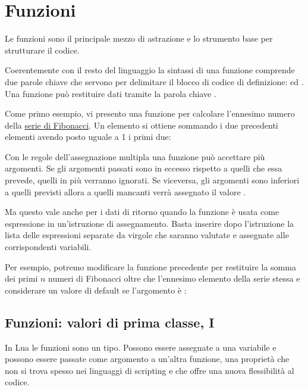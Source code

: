 
\chapter{Funzioni}

Le funzioni sono il principale mezzo di astrazione e lo strumento base per
strutturare il codice.

Coerentemente con il resto del linguaggio la sintassi di una funzione comprende
due parole chiave che servono per delimitare il blocco di codice di
definizione:  ed . Una funzione può restituire dati
tramite la parola chiave .

Come primo esempio, vi presento una funzione per calcolare l'ennesimo numero
della \href{http://it.wikipedia.org/wiki/Successione_di_Fibonacci}{serie di
Fibonacci}. Un elemento si ottiene sommando i due precedenti elementi avendo
posto uguale a 1 i primi due:

Con le regole dell'assegnazione multipla una funzione può accettare più
argomenti. Se gli argomenti passati sono in eccesso rispetto a quelli che essa
prevede, quelli in più verranno ignorati. Se viceversa, gli argomenti sono
inferiori a quelli previsti allora a quelli mancanti verrà assegnato il valore
.

Ma questo vale anche per i dati di ritorno quando la funzione è usata come
espressione in un'istruzione di assegnamento. Basta inserire dopo l'istruzione
 la lista delle espressioni separate da virgole che saranno valutate
e assegnate alle corrispondenti variabili.

Per esempio, potremo modificare la funzione precedente per restituire la somma
dei primi \( n \) numeri di Fibonacci oltre che l'ennesimo elemento della serie
stessa e considerare un valore di default se l'argomento è :


\section{Funzioni: valori di prima classe, I}

In Lua le funzioni sono un tipo. Possono essere assegnate a una variabile e
possono essere passate come argomento a un'altra funzione, una proprietà che
non si trova spesso nei linguaggi di scripting e che offre una nuova
flessibilità al codice.

